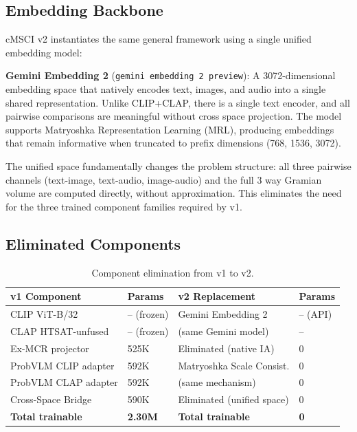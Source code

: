 \documentclass[a4paper,fleqn]{cas-sc}
\begin{document}
\begin{itemize}
\subsection{Embedding Backbone}\label{sec:v2-backbone}

cMSCI v2 instantiates the same general framework using a single unified embedding model:

\textbf{Gemini Embedding 2} (\texttt{gemini embedding 2 preview}): A 3072-dimensional embedding space that natively encodes text, images, and audio into a single shared representation. Unlike CLIP+CLAP, there is a single text encoder, and all pairwise comparisons are meaningful without cross space projection. The model supports Matryoshka Representation Learning (MRL), producing embeddings that remain informative when truncated to prefix dimensions (768, 1536, 3072).

The unified space fundamentally changes the problem structure: all three pairwise channels (text-image, text-audio, image-audio) and the full 3 way Gramian volume are computed directly, without approximation. This eliminates the need for the three trained component families required by v1.

\subsection{Eliminated Components}\label{sec:v2-eliminated}

\begin{table}[t]
\caption{Component elimination from v1 to v2.}\label{tab:v2-elimination}
\centering
\small
\begin{tabular}{llll}
\toprule
v1 Component & Params & v2 Replacement & Params \\
\midrule
CLIP ViT-B/32 & -- (frozen) & Gemini Embedding 2 & -- (API) \\
CLAP HTSAT-unfused & -- (frozen) & (same Gemini model) & -- \\
Ex-MCR projector & 525K & Eliminated (native IA) & 0 \\
ProbVLM CLIP adapter & 592K & Matryoshka Scale Consist. & 0 \\
ProbVLM CLAP adapter & 592K & (same mechanism) & 0 \\
Cross-Space Bridge & 590K & Eliminated (unified space) & 0 \\
\midrule
\textbf{Total trainable} & \textbf{2.30M} & \textbf{Total trainable} & \textbf{0} \\
\bottomrule
\end{tabular}
\end{table}


\end{itemize}
\end{document}

